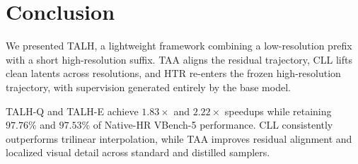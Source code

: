 \section{Conclusion}

We presented TALH, a lightweight framework combining a low-resolution
prefix with a short high-resolution suffix. TAA aligns the residual
trajectory, CLL lifts clean latents across resolutions, and HTR
re-enters the frozen high-resolution trajectory, with supervision
generated entirely by the base model.

TALH-Q and TALH-E achieve \(1.83\times\) and \(2.22\times\) speedups
while retaining \(97.76\%\) and \(97.53\%\) of Native-HR VBench-5
performance. CLL consistently outperforms trilinear interpolation,
while TAA improves residual alignment and localized visual detail across
standard and distilled samplers.
